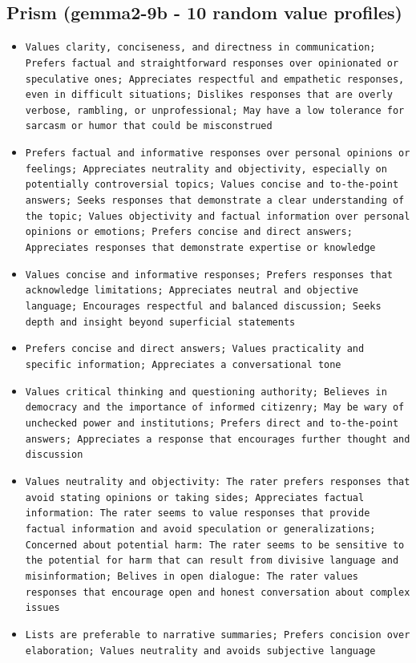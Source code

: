 \documentclass[11pt]{article}
\begin{document}
\subsection{Prism (gemma2-9b - 10 random value profiles)}
\begin{itemize}
\item \texttt{Values clarity, conciseness, and directness in communication; Prefers factual and straightforward responses over opinionated or speculative ones; Appreciates respectful and empathetic responses, even in difficult situations; Dislikes responses that are overly verbose, rambling, or unprofessional; May have a low tolerance for sarcasm or humor that could be misconstrued}
\item \texttt{Prefers factual and informative responses over personal opinions or feelings; Appreciates neutrality and objectivity, especially on potentially controversial topics; Values concise and to-the-point answers; Seeks responses that demonstrate a clear understanding of the topic; Values objectivity and factual information over personal opinions or emotions; Prefers concise and direct answers; Appreciates responses that demonstrate expertise or knowledge}
\item \texttt{Values concise and informative responses; Prefers responses that acknowledge limitations; Appreciates neutral and objective language; Encourages respectful and balanced discussion; Seeks depth and insight beyond superficial statements}
\item \texttt{Prefers concise and direct answers; Values practicality and specific information; Appreciates a conversational tone}
\item \texttt{Values critical thinking and questioning authority; Believes in democracy and the importance of informed citizenry; May be wary of unchecked power and institutions; Prefers direct and to-the-point answers; Appreciates a response that encourages further thought and discussion}
\item \texttt{Values neutrality and objectivity: The rater prefers responses that avoid stating opinions or taking sides; Appreciates factual information: The rater seems to value responses that provide factual information and avoid speculation or generalizations; Concerned about potential harm: The rater seems to be sensitive to the potential for harm that can result from divisive language and misinformation; Belives in open dialogue: The rater values responses that encourage open and honest conversation about complex issues}
\item \texttt{Lists are preferable to narrative summaries; Prefers concision over elaboration; Values neutrality and avoids subjective language}

\end{itemize}
\end{document}
